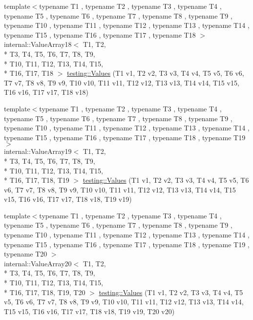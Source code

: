 \begin{DoxyCompactItemize}
{\footnotesize template$<$typename T1 , typename T2 , typename T3 , typename T4 , typename T5 , typename T6 , typename T7 , typename T8 , typename T9 , typename T10 , typename T11 , typename T12 , typename T13 , typename T14 , typename T15 , typename T16 , typename T17 , typename T18 $>$ }\\internal\-::\-Value\-Array18$<$ T1, T2, \\*
T3, T4, T5, T6, T7, T8, T9, \\*
T10, T11, T12, T13, T14, T15, \\*
T16, T17, T18 $>$ \hyperlink{namespacetesting_ab442a00c98b4bfb3bfa81f5e06bf53f9}{testing\-::\-Values} (T1 v1, T2 v2, T3 v3, T4 v4, T5 v5, T6 v6, T7 v7, T8 v8, T9 v9, T10 v10, T11 v11, T12 v12, T13 v13, T14 v14, T15 v15, T16 v16, T17 v17, T18 v18)
\item 
{\footnotesize template$<$typename T1 , typename T2 , typename T3 , typename T4 , typename T5 , typename T6 , typename T7 , typename T8 , typename T9 , typename T10 , typename T11 , typename T12 , typename T13 , typename T14 , typename T15 , typename T16 , typename T17 , typename T18 , typename T19 $>$ }\\internal\-::\-Value\-Array19$<$ T1, T2, \\*
T3, T4, T5, T6, T7, T8, T9, \\*
T10, T11, T12, T13, T14, T15, \\*
T16, T17, T18, T19 $>$ \hyperlink{namespacetesting_a673757dbfc048bbb48e459485b30b2bf}{testing\-::\-Values} (T1 v1, T2 v2, T3 v3, T4 v4, T5 v5, T6 v6, T7 v7, T8 v8, T9 v9, T10 v10, T11 v11, T12 v12, T13 v13, T14 v14, T15 v15, T16 v16, T17 v17, T18 v18, T19 v19)
\item 
{\footnotesize template$<$typename T1 , typename T2 , typename T3 , typename T4 , typename T5 , typename T6 , typename T7 , typename T8 , typename T9 , typename T10 , typename T11 , typename T12 , typename T13 , typename T14 , typename T15 , typename T16 , typename T17 , typename T18 , typename T19 , typename T20 $>$ }\\internal\-::\-Value\-Array20$<$ T1, T2, \\*
T3, T4, T5, T6, T7, T8, T9, \\*
T10, T11, T12, T13, T14, T15, \\*
T16, T17, T18, T19, T20 $>$ \hyperlink{namespacetesting_aedd2f90dfb3c42dce713ba0b89cde96c}{testing\-::\-Values} (T1 v1, T2 v2, T3 v3, T4 v4, T5 v5, T6 v6, T7 v7, T8 v8, T9 v9, T10 v10, T11 v11, T12 v12, T13 v13, T14 v14, T15 v15, T16 v16, T17 v17, T18 v18, T19 v19, T20 v20)

\end{DoxyCompactItemize}
